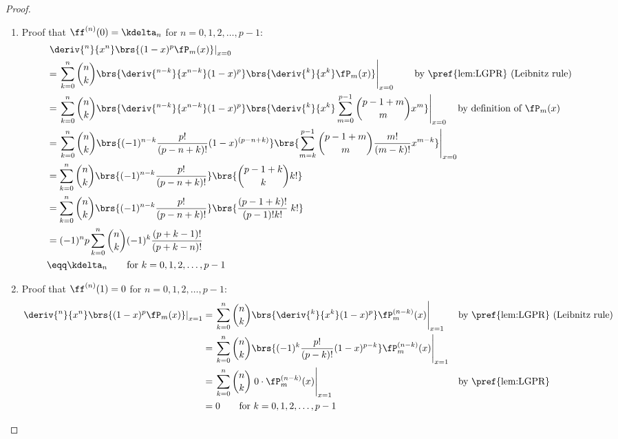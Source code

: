 \begin{proof}
\begin{enumerate}
  \item Proof that $\ff^{(n)}(0)=\kdelta_n$ for $n=0,1,2,\ldots,p-1$:
  \begin{align*}
  &\left.\deriv{^n}{x^n}\brs{ (1-x)^p \fP_m(x) }\right|_{x=0}
  \\&= \left.
       \sum_{k=0}^n {n\choose k}
       \brs{\deriv{^{n-k}}{x^{n-k}} (1-x)^p }
       \brs{\deriv{^k}{x^k}\fP_m(x) }
       \right|_{x=0}
    \qquad\text{by \pref{lem:LGPR} (Leibnitz rule)}
  \\&= \left.
       \sum_{k=0}^n {n\choose k}
       \brs{\deriv{^{n-k}}{x^{n-k}} (1-x)^p }
       \brs{\deriv{^k}{x^k} \sum_{m=0}^{p-1}{p-1+m \choose m} x^m }
       \right|_{x=0}
    \quad\text{by definition of $\fP_m(x)$}
  \\&= \left.
       \sum_{k=0}^n {n\choose k}
       \brs{(-1)^{n-k}\frac{p!}{(p-n+k)!} (1-x)^{(p-n+k)} }
       \brs{\sum_{m=k}^{p-1}{p-1+m \choose m} \frac{m!}{(m-k)!}x^{m-k} }
       \right|_{x=0}
  \\&= \sum_{k=0}^n {n\choose k}
       \brs{(-1)^{n-k}\frac{p!}{(p-n+k)!}}
       \brs{{p-1+k \choose k} k! }
  \\&= \sum_{k=0}^n {n\choose k}
       \brs{(-1)^{n-k}\frac{p!}{(p-n+k)!}}
       \brs{\frac{(p-1+k)!}{(p-1)!k!}\; k! }
  \\&= (-1)^n p
       \sum_{k=0}^n {n\choose k}
       (-1)^k\frac{(p+k-1)!}{(p+k-n)!}
  \\&\eqq \kdelta_n \qquad \text{for } k=0,1,2,\ldots,p-1
  \end{align*}

  \item Proof that $\ff^{(n)}(1)=0$ for $n=0,1,2,\ldots,p-1$:
  \begin{align*}
  \left.\deriv{^n}{x^n}\brs{ (1-x)^p \fP_m(x) }\right|_{x=1}
    &= \left.
       \sum_{k=0}^n {n\choose k}
       \brs{\deriv{^k}{x^k} (1-x)^p }
       \fP_m^{(n-k)}(x)
       \right|_{x=1}
    && \text{by \pref{lem:LGPR} (Leibnitz rule)}
  \\&= \left.
       \sum_{k=0}^n {n\choose k}
       \brs{(-1)^k\frac{p!}{(p-k)!} (1-x)^{p-k} }
       \fP_m^{(n-k)}(x)
       \right|_{x=1}
  \\&= \left.
       \sum_{k=0}^n {n\choose k} \; 0\cdot
       \fP_m^{(n-k)}(x)
       \right|_{x=1}
    && \text{by \pref{lem:LGPR}}
  \\&= 0 \qquad \text{for } k=0,1,2,\ldots,p-1
  \end{align*}
\end{enumerate}
\end{proof}






